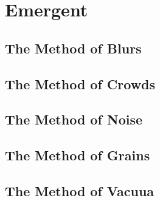 \documentclass{antiquebook}
\begin{document}
\chapter{Emergent}

    \section{The Method of Blurs}
    
    \section{The Method of Crowds}
    
    \section{The Method of Noise}
    
    \section{The Method of Grains}
    
    \section{The Method of Vacuua}
\end{document}

